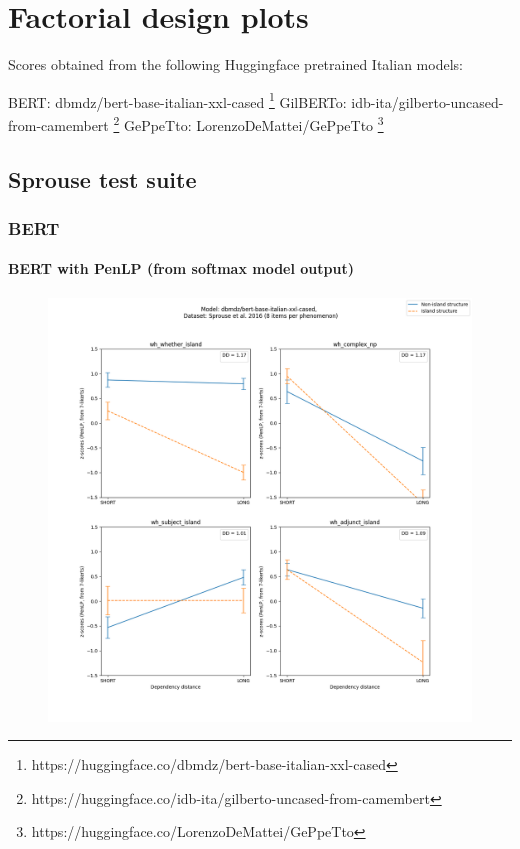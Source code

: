 \chapter{Factorial design plots}

Scores obtained from the following Huggingface pretrained Italian models:

BERT: dbmdz/bert-base-italian-xxl-cased \footnote{https://huggingface.co/dbmdz/bert-base-italian-xxl-cased}
GilBERTo: idb-ita/gilberto-uncased-from-camembert \footnote{https://huggingface.co/idb-ita/gilberto-uncased-from-camembert}
GePpeTto: LorenzoDeMattei/GePpeTto \citep{de2020geppetto} \footnote{https://huggingface.co/LorenzoDeMattei/GePpeTto}

\clearpage
\section{Sprouse test suite}

\subsection{BERT}

\subsubsection{BERT with PenLP (from softmax model output)}
\begin{figure}[h]
	\centering
	\includegraphics[width=1\textwidth]{images/AppendixA/Sprouse_wh_dbmdz_bert-base-italian-xxl-cased_PenLP-zscores-likert-2022-07-11.png} 
\end{figure}

